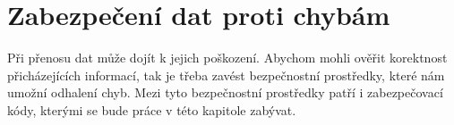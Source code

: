 \chapter{Zabezpečení dat proti chybám}
Při přenosu dat může dojít k jejich poškození. Abychom mohli ověřit korektnost přicházejících informací, tak je třeba zavést bezpečnostní prostředky, které nám umožní odhalení chyb. Mezi tyto bezpečnostní prostředky patří i zabezpečovací kódy, kterými se bude práce v této kapitole zabývat.

%
%
%




